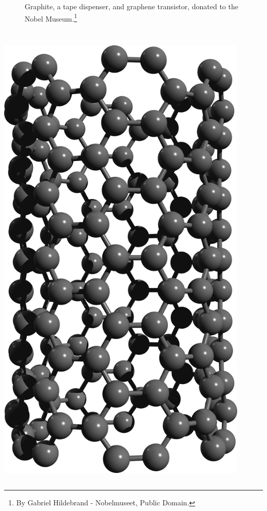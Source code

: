 \documentclass{beamer}
\begin{document}
\begin{frame}
\begin{columns}
\begin{figure}
{\scriptsize Graphite, a tape dispenser, and graphene transistor, donated to
the Nobel Museum.}\footnote[frame]{\tiny By
Gabriel Hildebrand - Nobelmuseet, Public Domain.}
\end{figure}

\end{columns}

\hspace{5mm}

\end{frame}




\begin{frame}

\begin{columns}


\begin{center}
\includegraphics[width=0.9\textwidth]{figs/nanotube2.png}\\


\end{center}
\end{columns}
\end{frame}
\end{document}
